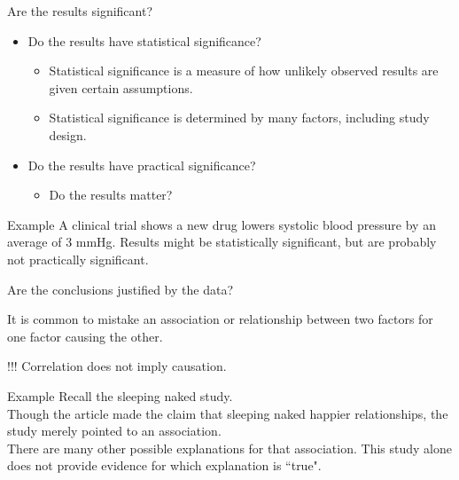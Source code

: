 \documentclass[xcolor=table, aspectratio=169, bigger, handout]{beamer}
\begin{document}
\begin{frame}{Are the results significant?}
\begin{block}{}
\begin{itemize}
\item Do the results have statistical significance?
\begin{itemize}
\item Statistical significance is a measure of how unlikely observed results are given certain assumptions.
\item Statistical significance is determined by many factors, including study design.
\end{itemize}
\pause\item Do the results have practical significance?
\begin{itemize}
\item Do the results matter?
\end{itemize}
\end{itemize}
\end{block}

\pause
\begin{exampleblock}{Example}
A clinical trial shows a new drug lowers systolic blood pressure by an average of 3 mmHg. Results might be statistically significant, but are probably not practically significant.
\end{exampleblock}
\end{frame}

\begin{frame}{Are the conclusions justified by the data?}

\begin{block}{}
It is common to mistake an association or relationship between two factors for one factor causing the other.
\end{block}

\pause

\begin{alertblock}{!!!}
\Large Correlation does not imply causation.
\end{alertblock}

\pause
\begin{exampleblock}{Example}
Recall the sleeping naked study.\\
\medskip
Though the article made the claim that sleeping naked  happier relationships, the study merely pointed to an association.\\
\medskip
There are many other possible explanations for that association. This study alone does not provide evidence for which explanation is ``true".

\end{exampleblock}

\end{frame}
\end{document}
